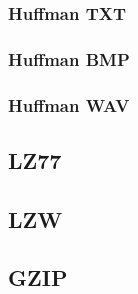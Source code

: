 \subsubsection{Huffman TXT}

\subsubsection{Huffman BMP}

\subsubsection{Huffman WAV}

\subsection{LZ77}

\subsection{LZW}

\subsection{GZIP}